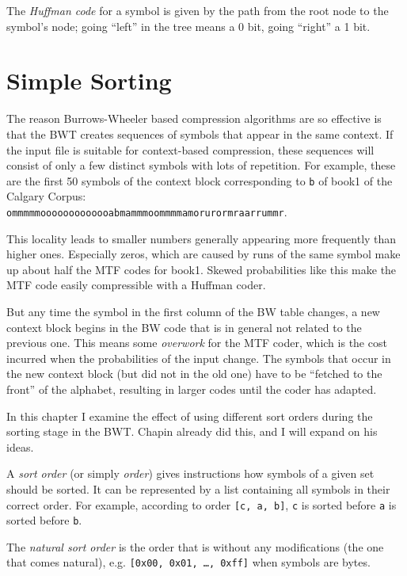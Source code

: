 \documentclass[a4paper]{scrreprt}
\begin{document}
The \emph{Huffman code} for a symbol is given by the path from the root node to
the symbol's node; going ``left'' in the tree means a 0 bit, going ``right'' a 1
bit.

\chapter{Simple Sorting}

The reason Burrows-Wheeler based compression algorithms are so effective is that
the BWT creates sequences of symbols that appear in the same context. If the
input file is suitable for context-based compression, these sequences will
consist of only a few distinct symbols with lots of repetition. For example,
these are the first 50 symbols of the context block corresponding to \texttt{b}
of book1 of the Calgary Corpus:\\
\texttt{ommmmmooooooooooooabmammmoommmmamorurormraarrummr}.

This locality leads to smaller numbers generally appearing more frequently than
higher ones. Especially zeros, which are caused by runs of the same symbol make
up about half the MTF codes for book1. Skewed probabilities like this make the
MTF code easily compressible with a Huffman coder.

But any time the symbol in the first column of the BW table changes, a new
context block begins in the BW code that is in general not related to the
previous one. This means some \emph{overwork} for the MTF coder, which is the
cost incurred when the probabilities of the input
change\cite{bitner1979heuristics}. The symbols that occur in the new context
block (but did not in the old one) have to be ``fetched to the front'' of the
alphabet, resulting in larger codes until the coder has adapted.

In this chapter I examine the effect of using different sort orders during the
sorting stage in the BWT. Chapin\cite{chapin1998sort,chapin2001diss} already did
this, and I will expand on his ideas.

A \emph{sort order} (or simply \emph{order}) gives instructions how symbols of a
given set should be sorted. It can be represented by a list containing all
symbols in their correct order. For example, according to order \texttt{[c, a,
b]}, \texttt{c} is sorted before \texttt{a} is sorted before \texttt{b}.

The \emph{natural sort order} is the order that is without any modifications
(the one that comes natural), e.g. \texttt{[0x00, 0x01, \ldots, 0xff]} when
symbols are bytes.
\end{document}
